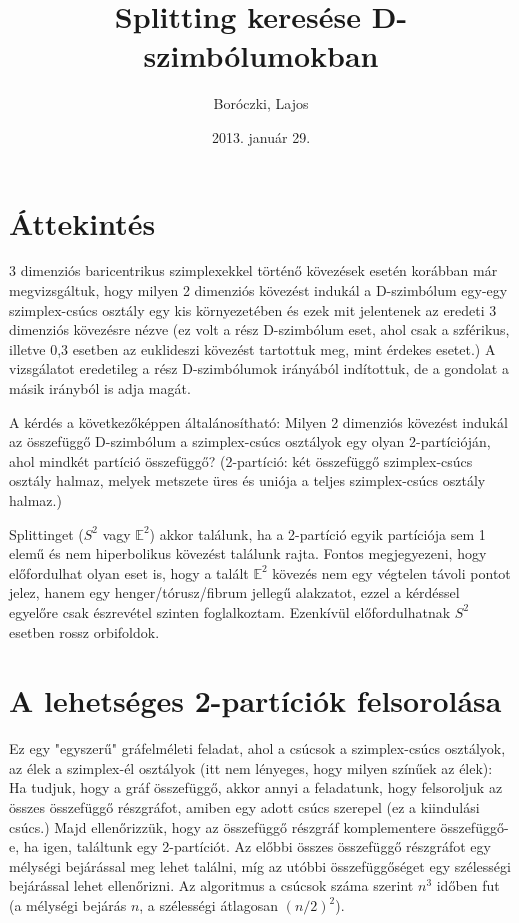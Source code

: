 \documentclass[12pt,magyar,a4paper]{article}
\title{Splitting keresése D-szimbólumokban}
\author{Boróczki, Lajos}
\date{2013. január 29.}
\begin{document}
\maketitle
\tableofcontents

\section{Áttekintés}
3 dimenziós baricentrikus szimplexekkel történő kövezések esetén korábban már
megvizsgáltuk, hogy milyen 2 dimenziós kövezést indukál a D-szimbólum egy-egy
szimplex-csúcs osztály egy kis környezetében és ezek mit jelentenek az eredeti 3
dimenziós kövezésre nézve (ez volt a rész D-szimbólum eset, ahol csak a
szférikus, illetve 0,3 esetben az euklideszi kövezést tartottuk meg, mint
érdekes esetet.) A vizsgálatot eredetileg a rész D-szimbólumok irányából
indítottuk, de a gondolat a másik irányból is adja magát.

A kérdés a következőképpen általánosítható: Milyen 2 dimenziós kövezést indukál
az összefüggő D-szimbólum a szimplex-csúcs osztályok egy olyan 2-partícióján,
ahol mindkét partíció összefüggő? (2-partíció: két összefüggő szimplex-csúcs
osztály halmaz, melyek metszete üres és uniója a teljes szimplex-csúcs osztály
halmaz.)

Splittinget ($S^2$ vagy $\mathbb{E}^2$) akkor találunk, ha a 2-partíció egyik partíciója sem
1 elemű és nem hiperbolikus kövezést találunk rajta. Fontos megjegyezeni, hogy
előfordulhat olyan eset is, hogy a talált $\mathbb{E}^2$ kövezés nem egy végtelen távoli
pontot jelez, hanem egy henger/tórusz/fibrum jellegű alakzatot, ezzel a
kérdéssel egyelőre csak észrevétel szinten foglalkoztam. Ezenkívül
előfordulhatnak $S^2$ esetben rossz orbifoldok.


\section{A lehetséges 2-partíciók felsorolása}
Ez egy "egyszerű" gráfelméleti feladat, ahol a csúcsok a szimplex-csúcs
osztályok, az élek a szimplex-él osztályok (itt nem lényeges, hogy milyen
színűek az élek): Ha tudjuk, hogy a gráf összefüggő, akkor annyi a feladatunk,
hogy felsoroljuk az összes összefüggő részgráfot, amiben egy adott csúcs
szerepel (ez a kiindulási csúcs.) Majd ellenőrizzük, hogy az összefüggő részgráf
komplementere összefüggő-e, ha igen, találtunk egy 2-partíciót. Az előbbi összes
összefüggő részgráfot egy mélységi bejárással meg lehet találni, míg az utóbbi
összefüggőséget egy szélességi bejárással lehet ellenőrizni. Az algoritmus
a csúcsok száma szerint $n^3$ időben fut (a mélységi bejárás $n$, a szélességi
átlagosan $(n/2)^2$).
\end{document}
